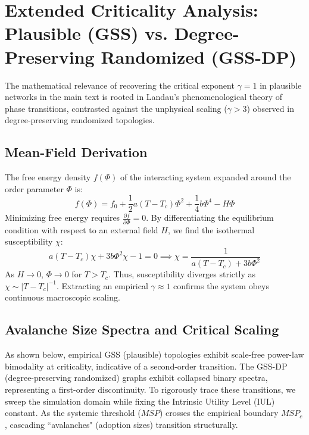 \documentclass[11pt,a4paper]{article}
\begin{document}
\section{Extended Criticality Analysis: Plausible (GSS) vs. Degree-Preserving Randomized (GSS-DP)}

The mathematical relevance of recovering the critical exponent $\gamma = 1$ in plausible networks in the main text is rooted in Landau's phenomenological theory of phase transitions, contrasted against the unphysical scaling ($\gamma > 3$) observed in degree-preserving randomized topologies. 

\subsection{Mean-Field Derivation}
The free energy density $f(\Phi)$ of the interacting system expanded around the order parameter $\Phi$ is:
\begin{equation}
    f(\Phi) = f_0 + \frac{1}{2}a(T - T_c)\Phi^2 + \frac{1}{4}b\Phi^4 - H\Phi
\end{equation}
Minimizing free energy requires $\frac{\partial f}{\partial \Phi} = 0$. By differentiating the equilibrium condition with respect to an external field $H$, we find the isothermal susceptibility $\chi$:
\begin{equation}
    a(T - T_c)\chi + 3b\Phi^2\chi - 1 = 0 \implies \chi = \frac{1}{a(T - T_c) + 3b\Phi^2}
\end{equation}
As $H \to 0$, $\Phi \to 0$ for $T > T_c$. Thus, susceptibility diverges strictly as $\chi \sim |T - T_c|^{-1}$. Extracting an empirical $\gamma \approx 1$ confirms the system obeys continuous macroscopic scaling.

\subsection{Avalanche Size Spectra and Critical Scaling}
As shown below, empirical GSS (plausible) topologies exhibit scale-free power-law bimodality at criticality, indicative of a second-order transition. The GSS-DP (degree-preserving randomized) graphs exhibit collapsed binary spectra, representing a first-order discontinuity. 
To rigorously trace these transitions, we sweep the simulation domain while fixing the Intrinsic Utility Level (IUL) constant. As the systemic threshold ($MSP$) crosses the empirical boundary $MSP_c$, cascading ``avalanches" (adoption sizes) transition structurally.
\end{document}
